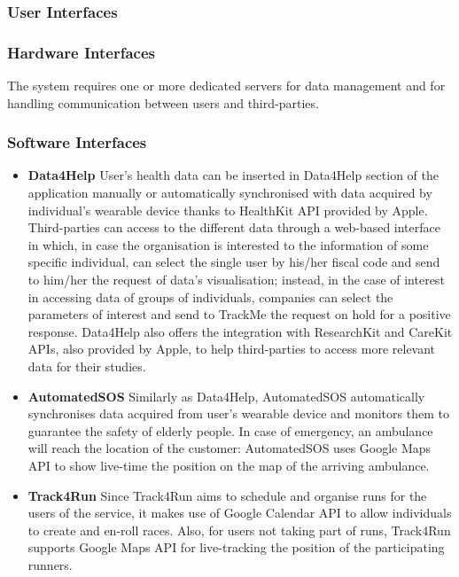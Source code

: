 \documentclass{article}
\begin{document}
	\subsubsection{User Interfaces} 
		
	
	\subsubsection{Hardware Interfaces}
	The system requires one or more dedicated servers for data 
	management and for handling communication between users and 
	third-parties.
	
	\subsubsection{Software Interfaces}
	\begin{itemize}
		\item \textbf{Data4Help} \newline 
		User's health data can be inserted in Data4Help section of the
		application manually or automatically synchronised with data
		acquired by individual's wearable device thanks to HealthKit
		API provided by Apple. \newline
		Third-parties can access to the different data through a 
		web-based interface in which, in case the organisation is 
		interested to the information of some specific individual, 
		can select the single user by his/her fiscal code and send to
		him/her the request of data's visualisation; instead, in the 
		case of interest in accessing data of groups of individuals, 
		companies can select the parameters of interest and send to 
		TrackMe the request on hold for a positive response. \newline
		Data4Help also offers the integration with ResearchKit and 
		CareKit APIs, also provided by Apple, to help third-parties to 
		access more relevant data for their studies.
		\item \textbf{AutomatedSOS} \newline
		Similarly as Data4Help, AutomatedSOS automatically 
		synchronises data acquired from user's wearable device and 
		monitors them to guarantee the safety of elderly people. 
		\newline
		In case of emergency, an ambulance will reach the location
		of the customer: AutomatedSOS uses Google Maps API to show 
		live-time the position on the map of the arriving ambulance. 
		\item \textbf{Track4Run} \newline
		Since Track4Run aims to schedule and organise runs for the 
		users of the service, it makes use of Google Calendar API to 
		allow individuals to create and en-roll races. 
		Also, for users not taking part of runs, Track4Run supports 
		Google Maps API for live-tracking the position of the 
		participating runners. 
	\end{itemize} 
	
\end{document}
